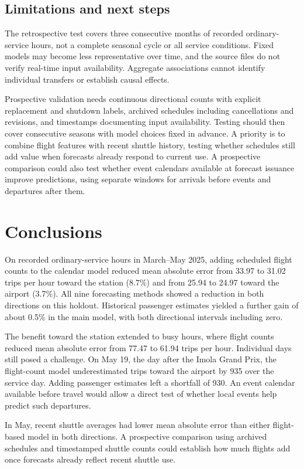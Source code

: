 \documentclass[preprint,12pt,times]{elsarticle}
\begin{document}
\subsection{Limitations and next steps}
The retrospective test covers three consecutive months of recorded ordinary-service hours, not a complete seasonal cycle or all service conditions. Fixed models may become less representative over time, and the source files do not verify real-time input availability. Aggregate associations cannot identify individual transfers or establish causal effects.

Prospective validation needs continuous directional counts with explicit replacement and shutdown labels, archived schedules including cancellations and revisions, and timestamps documenting input availability. Testing should then cover consecutive seasons with model choices fixed in advance. A priority is to combine flight features with recent shuttle history, testing whether schedules still add value when forecasts already respond to current use. A prospective comparison could also test whether event calendars available at forecast issuance improve predictions, using separate windows for arrivals before events and departures after them.

\section{Conclusions}
On recorded ordinary-service hours in March--May 2025, adding scheduled flight counts to the calendar model reduced mean absolute error from 33.97 to 31.02 trips per hour toward the station (8.7\%) and from 25.94 to 24.97 toward the airport (3.7\%). All nine forecasting methods showed a reduction in both directions on this holdout. Historical passenger estimates yielded a further gain of about 0.5\% in the main model, with both directional intervals including zero.

The benefit toward the station extended to busy hours, where flight counts reduced mean absolute error from 77.47 to 61.94 trips per hour. Individual days still posed a challenge. On May 19, the day after the Imola Grand Prix, the flight-count model underestimated trips toward the airport by 935 over the service day. Adding passenger estimates left a shortfall of 930. An event calendar available before travel would allow a direct test of whether local events help predict such departures.

In May, recent shuttle averages had lower mean absolute error than either flight-based model in both directions. A prospective comparison using archived schedules and timestamped shuttle counts could establish how much flights add once forecasts already reflect recent shuttle use.
\end{document}
